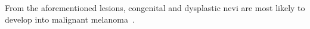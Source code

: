 From the aforementioned lesions, congenital and dysplastic nevi are most likely to develop into malignant melanoma~\cite{friedman1985early}.  


 



